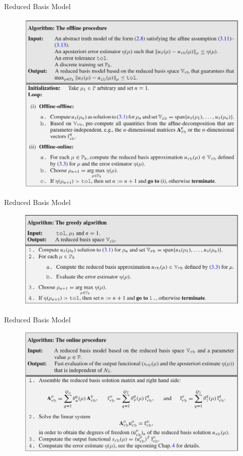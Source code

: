\documentclass[9pt]{beamer}
\begin{document}
\begin{frame}{Reduced Basis Model}
    \begin{figure}
        \centering
        \includegraphics[height=0.75\paperheight]{Offline.png}
    \end{figure}
\end{frame}

\begin{frame}{Reduced Basis Model}
    \begin{figure}
        \centering
        \includegraphics[width=\textwidth]{Greedy.png}
    \end{figure}
\end{frame}

\begin{frame}{Reduced Basis Model}
    \begin{figure}
        \centering
        \includegraphics[width=\textwidth]{Online.png}
    \end{figure}
\end{frame}
\end{document}
